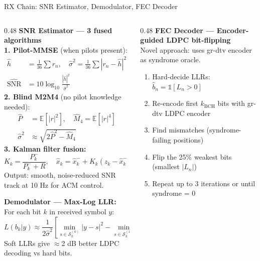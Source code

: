 \documentclass[aspectratio=169,10pt]{beamer}
\begin{document}
\begin{frame}[shrink=15]{RX Chain: SNR Estimator, Demodulator, FEC Decoder}
  \begin{columns}[T]
    \begin{column}{0.48\textwidth}
      \textbf{SNR Estimator — 3 fused algorithms}\\
      \textbf{1. Pilot-MMSE} (when pilots present):
      \begin{align*}
        \hat{h}&=\tfrac{1}{36}\sum r_n,\quad\hat{\sigma}^2=\tfrac{1}{36}\sum|r_n-\hat{h}|^2\\
        \widehat{\text{SNR}}&=10\log_{10}\tfrac{|\hat{h}|^2}{\hat{\sigma}^2}
      \end{align*}
      \textbf{2. Blind M2M4} (no pilot knowledge needed):
      \begin{align*}
        \hat{P}&=\mathbb{E}[|r|^2],\quad\hat{M}_4=\mathbb{E}[|r|^4]\\
        \hat{\sigma}^2&\approx\sqrt{2\hat{P}^2-\hat{M}_4}
      \end{align*}
      \textbf{3. Kalman filter fusion:}
      \[K_k=\frac{P^-_k}{P^-_k+R},\quad
        \hat{x}_k=\hat{x}^-_k+K_k(z_k-\hat{x}^-_k)\]
      \scriptsize Output: smooth, noise-reduced SNR track at 10 Hz for ACM control.

      \vspace{0.3em}
      \textbf{Demodulator — Max-Log LLR:}\\
      \scriptsize For each bit $k$ in received symbol $y$:
      \[L(b_k|y)\approx\frac{1}{2\hat{\sigma}^2}
        \left[\min_{s\in\mathcal{S}_k^{(0)}}|y-s|^2 - \min_{s\in\mathcal{S}_k^{(1)}}|y-s|^2\right]\]
      Soft LLRs give $\approx$2 dB better LDPC decoding vs hard bits.
    \end{column}
    \begin{column}{0.48\textwidth}
      \textbf{FEC Decoder — Encoder-guided LDPC bit-flipping}\\
      \scriptsize Novel approach: uses gr-dtv encoder as syndrome oracle.
      \begin{enumerate}\scriptsize
        \item Hard-decide LLRs: $\hat{b}_n = \mathbb{1}[L_n>0]$
        \item Re-encode first $k_\text{BCH}$ bits with gr-dtv LDPC encoder
        \item Find mismatches (syndrome-failing positions)
        \item Flip the 25\% weakest bits (smallest $|L_n|$)
        \item Repeat up to 3 iterations or until syndrome = 0
      \end{enumerate}


\end{column}
\end{columns}
\end{frame}
\end{document}
